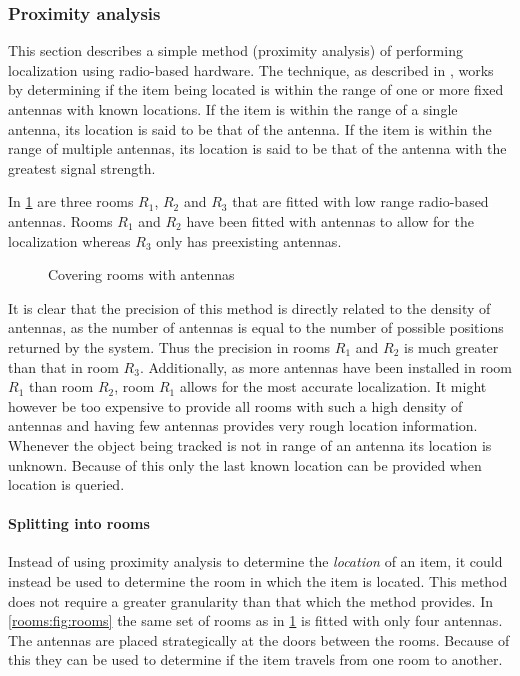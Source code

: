 \subsubsection{Proximity analysis}\label{rooms}
This section describes a simple method (proximity analysis) of performing localization using radio-based hardware.
The technique, as described in \citet[Section II.C Proximity]{wireless_survey}, works by determining if the item being located is within the range of one or more fixed antennas with known locations.
If the item is within the range of a single antenna, its location is said to be that of the antenna.
If the item is within the range of multiple antennas, its location is said to be that of the antenna with the greatest signal strength.

In \cref{rooms:fig:cover} are three rooms $R_1$, $R_2$ and $R_3$ that are fitted with low range radio-based antennas.
Rooms $R_1$ and $R_2$ have been fitted with antennas to allow for the localization whereas $R_3$ only has preexisting antennas.

\begin{figure}[h]
\centering

\caption{Covering rooms with antennas}
\label{rooms:fig:cover}
\end{figure}

It is clear that the precision of this method is directly related to the density of antennas, as the number of antennas is equal to the number of possible positions returned by the system.
Thus the precision in rooms $R_1$ and $R_2$ is much greater than that in room $R_3$.
Additionally, as more antennas have been installed in room $R_1$ than room $R_2$, room $R_1$ allows for the most accurate localization.
It might however be too expensive to provide all rooms with such a high density of antennas and having few antennas provides very rough location information.
Whenever the object being tracked is not in range of an antenna its location is unknown.
Because of this only the last known location can be provided when location is queried.

\paragraph{Splitting into rooms}
Instead of using proximity analysis to determine the \textit{location} of an item, it could instead be used to determine the room in which the item is located.
This method does not require a greater granularity than that which the method provides.
In \cref{rooms:fig:rooms} the same set of rooms as in \cref{rooms:fig:cover} is fitted with only four antennas.
The antennas are placed strategically at the doors between the rooms.
Because of this they can be used to determine if the item travels from one room to another.

